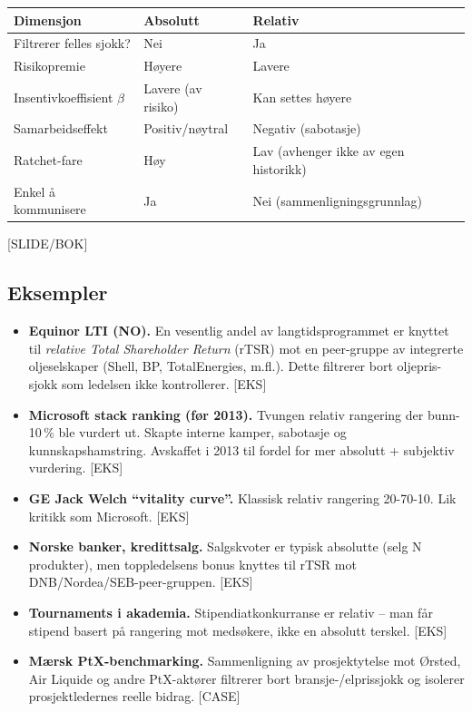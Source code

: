 \begin{center}
\renewcommand{\arraystretch}{1.2}
\begin{tabular}{@{}p{3.5cm}p{5.0cm}p{5.0cm}@{}}
\toprule
\textbf{Dimensjon} & \textbf{Absolutt} & \textbf{Relativ} \\
\midrule
Filtrerer felles sjokk? & Nei & Ja \\
Risikopremie & Høyere & Lavere \\
Insentivkoeffisient $\beta$ & Lavere (av risiko) & Kan settes høyere \\
Samarbeidseffekt & Positiv/nøytral & Negativ (sabotasje) \\
Ratchet-fare & Høy & Lav (avhenger ikke av egen historikk) \\
Enkel å kommunisere & Ja & Nei (sammenligningsgrunnlag) \\
\bottomrule
\end{tabular}
\end{center}
[SLIDE/BOK]

\subsection*{Eksempler}
\begin{itemize}
\item \textbf{Equinor LTI (NO).} En vesentlig andel av langtidsprogrammet er knyttet til \emph{relative Total Shareholder Return} (rTSR) mot en peer-gruppe av integrerte oljeselskaper (Shell, BP, TotalEnergies, m.fl.). Dette filtrerer bort oljepris-sjokk som ledelsen ikke kontrollerer. [EKS]
\item \textbf{Microsoft stack ranking (før 2013).} Tvungen relativ rangering der bunn-10\,\% ble vurdert ut. Skapte interne kamper, sabotasje og kunnskapshamstring. Avskaffet i 2013 til fordel for mer absolutt + subjektiv vurdering. [EKS]
\item \textbf{GE Jack Welch ``vitality curve''.} Klassisk relativ rangering 20-70-10. Lik kritikk som Microsoft. [EKS]
\item \textbf{Norske banker, kredittsalg.} Salgskvoter er typisk absolutte (selg N produkter), men toppledelsens bonus knyttes til rTSR mot DNB/Nordea/SEB-peer-gruppen. [EKS]
\item \textbf{Tournaments i akademia.} Stipendiatkonkurranse er relativ -- man får stipend basert på rangering mot medsøkere, ikke en absolutt terskel. [EKS]
\item \textbf{Mærsk PtX-benchmarking.} Sammenligning av prosjektytelse mot Ørsted, Air Liquide og andre PtX-aktører filtrerer bort bransje-/elprissjokk og isolerer prosjektledernes reelle bidrag. [CASE]
\end{itemize}

